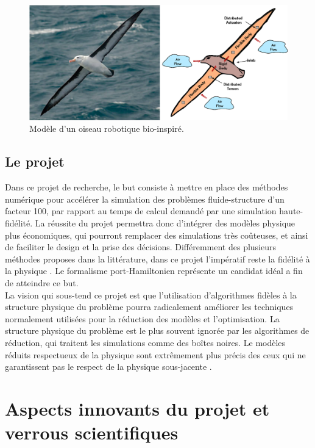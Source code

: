 \documentclass[french]{article}
\begin{document}
\begin{figure}[tb]
	\centering
	\includegraphics[width = .7\textwidth]{Bird_Port_Hamiltonian_Subsystems_FULL_ARC.eps}
	\caption{Modèle d'un oiseau robotique bio-inspiré.}
	\label{fig:pH_view_bird}
\end{figure}

\subsection{Le projet}
Dans ce projet de recherche, le but consiste \`a mettre en place des méthodes numérique pour accélérer la simulation des problèmes fluide-structure d'un facteur 100, par rapport au temps de calcul demandé par une simulation haute-fidélité.  La réussite du projet permettra donc d'intégrer des modèles physique plus économiques, qui pourront remplacer des simulations très co\^{u}teuses, et ainsi de faciliter le design et la prise des décisions. Différemment des plusieurs méthodes proposes dans la littérature, dans ce projet l'impératif reste la fidélité \`a la physique \cite{willcox2021}. Le formalisme port-Hamiltonien représente un candidat idéal a fin de atteindre ce but. \\

La vision qui sous-tend ce projet est que l'utilisation d'algorithmes fidèles \`a la structure physique du problème pourra radicalement améliorer les techniques normalement utilisées pour la réduction des modèles et l'optimisation. La structure physique du problème est le plus souvent ignorée par les algorithmes de réduction, qui traitent les simulations comme des bo\^{i}tes noires. Le modèles réduits respectueux de la physique sont extrêmement plus précis des ceux qui ne garantissent pas le respect de la physique sous-jacente \cite{lee2020}. 


\section{Aspects innovants du projet et verrous scientifiques}
\end{document}
